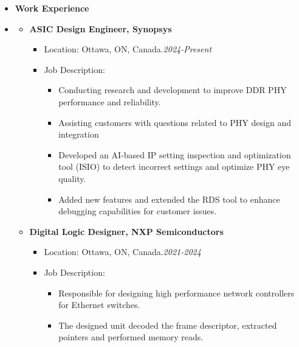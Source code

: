 \begin {itemize} \item [] {\bf \Large   Work Experience }  \vspace{-1.5em}
\item []  {\bf \hrulefill } \mdseries \normalsize 
    \begin {itemize}
    \item [$\bullet$] \bf {\mtf \normalsize  ASIC Design Engineer, Synopsys} \mdseries
            \begin {itemize}
                \item [-]  {  Location:  Ottawa, ON,  Canada.\small \hspace{5.8cm}\textit{2024-Present}\normalsize} 
                \item [-]   {   Job Description:} 
                    \begin {itemize}   
                        \item [\textbullet] Conducting research and development to improve DDR PHY performance and reliability.
                        \item [\textbullet] Assisting customers with questions related to PHY design and integration
                        \item [\textbullet] Developed an AI-based IP setting inspection and optimization tool (ISIO) to detect incorrect settings and optimize PHY eye quality.
                        \item [\textbullet] Added new features and extended the RDS tool to enhance debugging capabilities for customer issues.
                    \end {itemize}
            \end {itemize} \vspace{0.3cm}
        \item [$\bullet$] \bf {\mtf \normalsize  Digital Logic Designer, NXP Semiconductors} \mdseries
            \begin {itemize}
                \item [-]  {  Location:  Ottawa, ON,  Canada.\small \hspace{5.8cm}\textit{2021-2024}\normalsize} 
                \item [-]   {   Job Description:} 
                    \begin {itemize}   
                        \item [\textbullet] Responsible for designing high performance network controllers for Ethernet switches.
                        \item [\textbullet] The designed unit decoded the frame descriptor, extracted pointers and performed memory reads.

\end{itemize}
\end{itemize}
\end{itemize}
\end{itemize}
